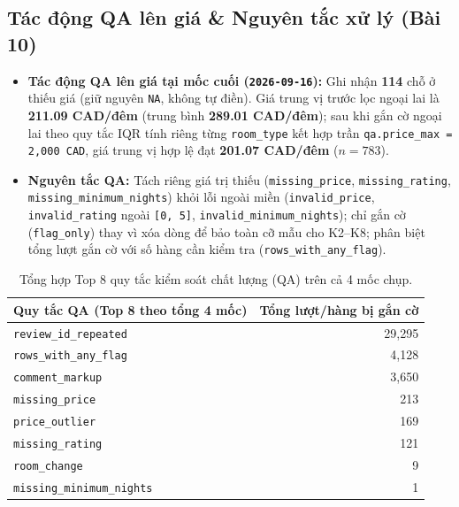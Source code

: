 \documentclass[11pt,a4paper]{article}
\begin{document}
\subsection{Tác động QA lên giá \& Nguyên tắc xử lý (Bài 10)}
\begin{itemize}
  \item \textbf{Tác động QA lên giá tại mốc cuối (\texttt{2026-09-16}):} Ghi nhận \textbf{114} chỗ ở thiếu giá (giữ nguyên \texttt{NA}, không tự điền). Giá trung vị trước lọc ngoại lai là \textbf{211.09 CAD/đêm} (trung bình \textbf{289.01 CAD/đêm}); sau khi gắn cờ ngoại lai theo quy tắc IQR tính riêng từng \texttt{room\_type} kết hợp trần \texttt{qa.price\_max = 2,000 CAD}, giá trung vị hợp lệ đạt \textbf{201.07 CAD/đêm} ($n = 783$).
  \item \textbf{Nguyên tắc QA:} Tách riêng giá trị thiếu (\texttt{missing\_price}, \texttt{missing\_rating}, \texttt{missing\_minimum\_nights}) khỏi lỗi ngoài miền (\texttt{invalid\_price}, \texttt{invalid\_rating} ngoài \texttt{[0, 5]}, \texttt{invalid\_minimum\_nights}); chỉ gắn cờ (\texttt{flag\_only}) thay vì xóa dòng để bảo toàn cỡ mẫu cho K2--K8; phân biệt tổng lượt gắn cờ với số hàng cần kiểm tra (\texttt{rows\_with\_any\_flag}).
\end{itemize}

\begin{table}[H]
  \centering
  \small
  \renewcommand{\arraystretch}{1.2}
  \begin{tabularx}{0.76\textwidth}{Xr}
    \toprule
    \rowcolor{NavyDark}
    \color{white}\textbf{Quy tắc QA (Top 8 theo tổng 4 mốc)} &
    \color{white}\textbf{Tổng lượt/hàng bị gắn cờ} \\
    \midrule
    \texttt{review\_id\_repeated} & 29,295 \\
    \rowcolor{LightBg}
    \texttt{rows\_with\_any\_flag} & 4,128 \\
    \texttt{comment\_markup} & 3,650 \\
    \rowcolor{LightBg}
    \texttt{missing\_price} & 213 \\
    \texttt{price\_outlier} & 169 \\
    \rowcolor{LightBg}
    \texttt{missing\_rating} & 121 \\
    \texttt{room\_change} & 9 \\
    \rowcolor{LightBg}
    \texttt{missing\_minimum\_nights} & 1 \\
    \bottomrule
  \end{tabularx}
  \caption{\small Tổng hợp Top 8 quy tắc kiểm soát chất lượng (QA) trên cả 4 mốc chụp.}
\end{table}
\end{document}
